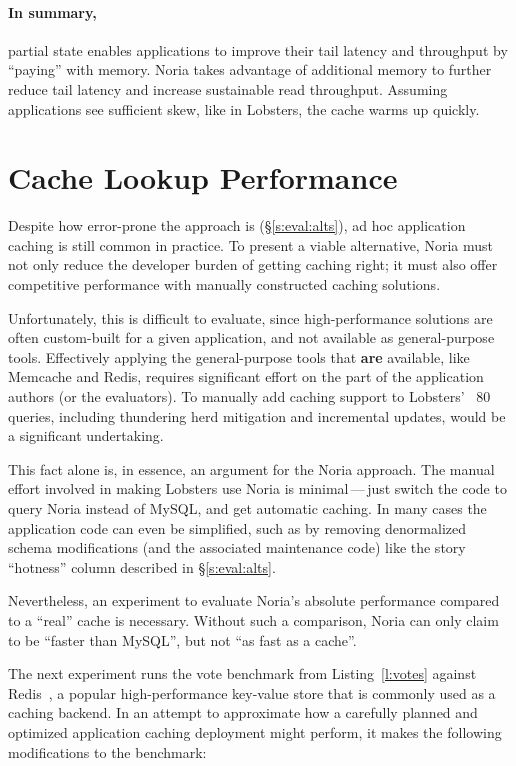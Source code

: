 \paragraph{In summary,} partial state enables applications to improve their
tail latency and throughput by ``paying'' with memory. Noria takes advantage of
additional memory to further reduce tail latency and increase sustainable
read throughput. Assuming applications see sufficient skew, like in Lobsters,
the cache warms up quickly.

\section{Cache Lookup Performance}
\label{s:eval:kvperf}

Despite how error-prone the approach is (\S\ref{s:eval:alts}), ad hoc
application caching is still common in practice. To present a viable
alternative, Noria must not only reduce the developer burden of getting caching
right; it must also offer competitive performance with manually constructed
caching solutions.

Unfortunately, this is difficult to evaluate, since high-performance solutions
are often custom-built for a given application, and not available as
general-purpose tools. Effectively applying the general-purpose tools that
\textbf{are} available, like Memcache and Redis, requires significant effort on
the part of the application authors (or the evaluators). To manually add caching
support to Lobsters' ~80 queries, including thundering herd mitigation and
incremental updates, would be a significant undertaking.

This fact alone is, in essence, an argument for the Noria approach. The manual
effort involved in making Lobsters use Noria is minimal\,---\,just switch the
code to query Noria instead of MySQL, and get automatic caching. In many cases
the application code can even be simplified, such as by removing denormalized
schema modifications (and the associated maintenance code) like the story
``hotness'' column described in \S\ref{s:eval:alts}.

Nevertheless, an experiment to evaluate Noria's absolute performance compared to
a ``real'' cache is necessary. Without such a comparison, Noria can only claim
to be ``faster than MySQL'', but not ``as fast as a cache''.

The next experiment runs the vote benchmark from Listing~\vref{l:votes} against
Redis~\cite{redis}, a popular high-performance key-value store that is commonly
used as a caching backend. In an attempt to approximate how a carefully planned
and optimized application caching deployment might perform, it makes the
following modifications to the benchmark:

